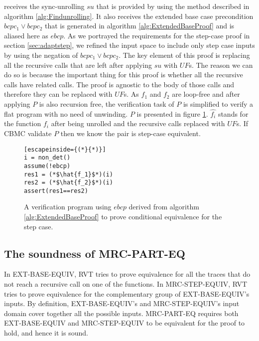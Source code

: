  receives the sync-unrolling $su$ that is provided by using the method described in algorithm \ref{alg:Findunrolling}. It also receives the extended base case precondition $bcpc_1 \lor bcpc_2$ that is generated in algorithm \ref{alg:ExtendedBaseProof} and is aliased here as $ebcp$. As we portrayed the requirements for the step-case proof in section \ref{sec:adaptstep}, we refined the input space to include only step case inputs by using the negation of $bcpc_1 \lor bcpc_2$. The key element of this proof is replacing all the recursive calls that are left after applying $su$ with $UF$s. The reason we can do so is because the important thing for this proof is whether all the recursive calls have related calls. The proof is agnostic to the body of those calls and therefore they can be replaced with $UF$s. As $f_1$ and $f_2$ are loop-free and after applying  $P$ is also recursion free, the verification task of $P$ is simplified to verify a flat program with no need of unwinding. $P$ is presented in figure \ref{fig:stepvefprogram}. $\hat{f_i}$ stands for the function $f_i$ after being unrolled and the recursive calls replaced with $UF$s. If CBMC validate $P$ then we know the pair is step-case equivalent. 
\begin{figure} [h]
\begin{center}
\begin{minipage}{7 cm}
\begin{lstlisting}[escapeinside={(*}{*)}]
i = non_det()
assume(!ebcp)
res1 = (*$\hat{f_1}$*)(i)
res2 = (*$\hat{f_2}$*)(i)
assert(res1==res2)
\end{lstlisting}
\end{minipage}
\caption{A verification program using $ebcp$ derived from algorithm \ref{alg:ExtendedBaseProof} to prove conditional equivalence for the step case.}
\label{fig:stepvefprogram}
\end{center}
\end{figure}

\subsection{The soundness of MRC-PART-EQ}
\label{sec:MRCsoundness}
In EXT-BASE-EQUIV, RVT tries to prove equivalence for all the traces that do not reach a recursive call on one of the functions. In MRC-STEP-EQUIV, RVT tries to prove equivalence for the complementary group of EXT-BASE-EQUIV's inputs. By definition, EXT-BASE-EQUIV's and MRC-STEP-EQUIV's input domain cover together all the possible inputs. MRC-PART-EQ requires both EXT-BASE-EQUIV and MRC-STEP-EQUIV to be equivalent for the proof to hold, and hence it is sound.

